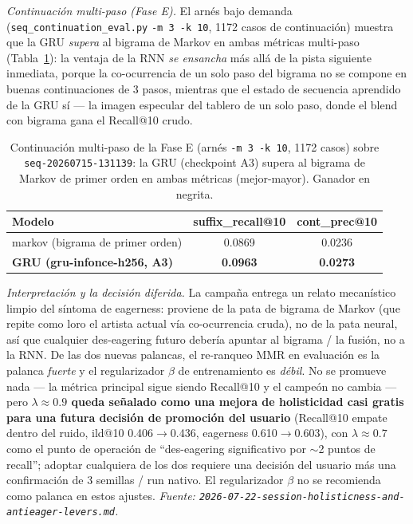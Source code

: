 \documentclass[11pt]{article}
\newcommand{\dsid}[1]{\texttt{\small #1}}
\newcommand{\best}[1]{\textbf{#1}}
\begin{document}
\emph{Continuación multi-paso (Fase E).} El arnés bajo demanda
(\texttt{seq\_continuation\_eval.py} \texttt{-m 3 -k 10}, \num{1172} casos de
continuación) muestra que la GRU \emph{supera} al bigrama de Markov en ambas métricas
multi-paso (Tabla~\ref{tab:continuation}): la ventaja de la RNN \emph{se ensancha} más
allá de la pista siguiente inmediata, porque la co-ocurrencia de un solo paso del
bigrama no se compone en buenas continuaciones de 3 pasos, mientras que el estado de
secuencia aprendido de la GRU sí --- la imagen especular del tablero de un solo paso,
donde el blend con bigrama gana el Recall@10 crudo.

\begin{table}[ht]
  \centering
  \caption{Continuación multi-paso de la Fase E (arnés \texttt{-m 3 -k 10},
  \num{1172} casos) sobre \dsid{seq-20260715-131139}: la GRU (checkpoint A3) supera al
  bigrama de Markov de primer orden en ambas métricas (mejor-mayor). Ganador en negrita.}
  \label{tab:continuation}
  {\footnotesize\setlength{\tabcolsep}{6pt}\begin{tabular}{lcc}
    \toprule
    Modelo & suffix\_recall@10 & cont\_prec@10 \\
    \midrule
    markov (bigrama de primer orden) & 0.0869 & 0.0236 \\
    \best{GRU (gru-infonce-h256, A3)} & \best{0.0963} & \best{0.0273} \\
    \bottomrule
  \end{tabular}}
\end{table}

\emph{Interpretación y la decisión diferida.} La campaña entrega un relato mecanístico
limpio del síntoma de eagerness: proviene de la pata de bigrama de Markov (que repite
como loro el artista actual vía co-ocurrencia cruda), no de la pata neural, así que
cualquier des-eagering futuro debería apuntar al bigrama / la fusión, no a la RNN. De
las dos nuevas palancas, el re-ranqueo MMR en evaluación es la palanca \emph{fuerte} y
el regularizador $\beta$ de entrenamiento es \emph{débil}. No se promueve nada --- la
métrica principal sigue siendo Recall@10 y el campeón no cambia --- pero
\textbf{$\lambda\approx\num{0.9}$ queda señalado como una mejora de holisticidad casi
gratis para una futura decisión de promoción del usuario} (Recall@10 empate dentro del
ruido, ild@10 \num{0.406}$\to$\num{0.436}, eagerness \num{0.610}$\to$\num{0.603}), con
$\lambda\approx\num{0.7}$ como el punto de operación de ``des-eagering significativo por
$\sim$2 puntos de recall''; adoptar cualquiera de los dos requiere una decisión del
usuario más una confirmación de 3 semillas / run nativo. El regularizador $\beta$ no se
recomienda como palanca en estos ajustes.
\emph{Fuente: \texttt{2026-07-22-session-holisticness-and-antieager-levers.md}.}
\end{document}
